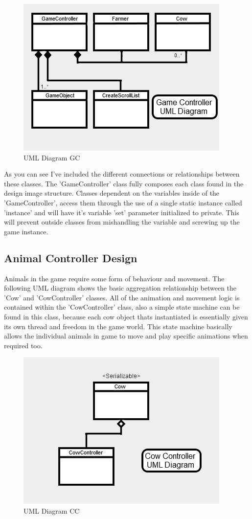 \begin{figure}[!ht]
	\caption{UML Diagram GC}
	\centering
	\includegraphics{img/gc_uml.png}
\end{figure}

As you can see I've included the different connections or relationships between these classes. The 'GameController' class fully composes each class found in the design image structure. Classes dependent on the variables inside of the 'GameController', access them through the use of a single static instance called 'instance' and will have it's variable 'set' parameter initialized to private. This will prevent outside classes from mishandling the variable and screwing up the game instance.
\subsection{Animal Controller Design}
Animals in the game require some form of behaviour and movement. The following UML diagram shows the basic aggregation relationship between the 'Cow' and 'CowController' classes. All of the animation and movement logic is contained within the 'CowController' class, also a simple state machine can be found in this class, because each cow object thats instantiated is essentially given its own thread and freedom in the game world. This state machine basically allows the individual animals in game to move and play specific animations when required too.

\begin{figure}[!ht]
	\caption{UML Diagram CC}
	\centering
	\includegraphics{img/cow_uml.png}
\end{figure}

